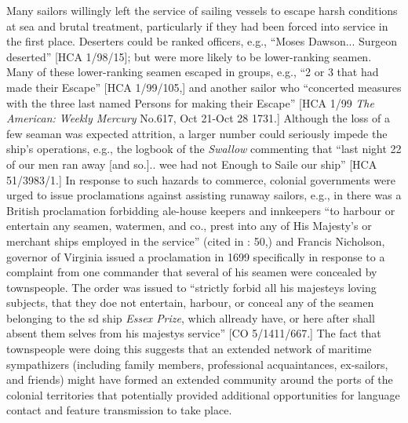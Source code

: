   Many sailors willingly left the service of sailing vessels to escape harsh conditions at sea and brutal treatment, particularly if they had been forced into service in the first place. Deserters could be ranked officers, e.g., “Moses Dawson... Surgeon deserted” [HCA 1/98/15]; but were more likely to be lower-ranking seamen. Many of these lower-ranking seamen escaped in groups, e.g., “2 or 3 that had made their Escape” [HCA 1/99/105,] and another sailor who “concerted measures with the three last named Persons for making their Escape” [HCA 1/99 \textit{The American: Weekly Mercury} No.617, Oct 21-Oct 28 1731.] Although the loss of a few seaman was expected attrition, a larger number could seriously impede the ship’s operations, e.g., the logbook of the \textit{Swallow} commenting that “last night 22 of our men ran away [and so.]..  wee had not Enough to Saile our ship” [HCA 51/3983/1.] In response to such hazards to commerce, colonial governments were urged to issue proclamations against  assisting runaway sailors, e.g., in \citealt{April1643} there was a British proclamation forbidding ale-house keepers and innkeepers “to harbour or entertain any seamen, watermen, and co., prest into any of His Majesty’s or merchant ships employed in the service” (cited in \citealt{Lavery2009}: 50,) and Francis Nicholson, governor of Virginia issued a proclamation in 1699 specifically in response to a complaint from one commander that several of his seamen were concealed by townspeople. The order was issued to “strictly forbid all his majesteys loving subjects, that they doe not entertain, harbour, or conceal any of the seamen belonging to the sd ship \textit{Essex Prize}, which allready have, or here after shall absent them selves from his majestys service” [CO 5/1411/667.] The fact that townspeople were doing this suggests that an extended network of maritime sympathizers (including family members, professional acquaintances, ex-sailors, and friends) might have formed an extended community around the ports of the colonial territories that potentially provided additional opportunities for language contact and feature transmission to take place. 

